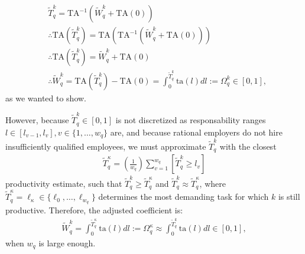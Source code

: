 \documentclass[hidelinks, nonatbib]{elsarticle}
\begin{document}
\begin{align}
    &\tilde{T}_{q}^{k}
    =
    \text{TA}^{-1}
    \left(
        \tilde{W}_{q}^{k}
        +
        \text{TA}(0)
    \right)
    \\
    &
    \therefore
    \text{TA}
    (
        \tilde{T}_{q}^{k}
    )
    =
    \text{TA}
    \left(
        \text{TA}^{-1}
        \left(
            \tilde{W}_{q}^{k}
            +
            \text{TA}(0)
        \right)
    \right)
    \\
    &
    \therefore
    \text{TA}
    (
        \tilde{T}_{q}^{k}
    )
    =
    \tilde{W}_{q}^{k}
    +
    \text{TA}(0)
    \\
    &
    \therefore
    \tilde{W}_{q}^{k}
    =
    \text{TA}
    (
        \tilde{T}_{q}^{k}
    )
    -
    \text{TA}(0)
    =
    \int_{0}^{\tilde{T}_{q}^{k}}
    \text{ta}(l)
    dl
    :=
    \Omega_{q}^{k}
    \in 
    [0,1]
    ,
\end{align}
as we wanted to show.

However, because $\tilde{T}_{q}^{k} \in [0,1]$ is not discretized as responsability ranges $l \in [l_{v-1},l_{v}], v \in \{1, \dots, w_q\}$ are, and because rational employers do not hire insufficiently qualified employees, we must approximate $\tilde{T}_{q}^{k}$ with the closest 
\begin{gather}
    \tilde{T}_{q}^{\kappa}
    =
    \left(
        \frac{1}{w_q}
    \right)
    \sum_{v=1}^{w_q}
    \left[
        \tilde{T}_{q}^{k}
        \geq
        l_v
    \right]
\end{gather}
productivity estimate, such that $\tilde{T}_{q}^{k} \geq \tilde{T}_{q}^{\kappa}$ and $\tilde{T}_{q}^{k} \approx \tilde{T}_{q}^{\kappa}$, where $
\tilde{T}_{q}^{\kappa} = \ell_{\kappa} \in \{\ell_0, \dots, \ell_{w_q}\}$ determines the most demanding task for which $k$ is still productive. Therefore, the adjusted coefficient is:
\begin{gather}
    \tilde{W}_{q}^{k}
    =
    \int_{0}^{\tilde{T}_{q}^{\kappa}}
    \text{ta}(l)
    dl
    :=
    \Omega_{q}^{\kappa}
    \approx
    \int_{0}^{\tilde{T}_{q}^{k}}
    \text{ta}(l)
    dl
    \in 
    [0,1]
    ,
\end{gather}
when $w_q$ is large enough.
\end{document}
